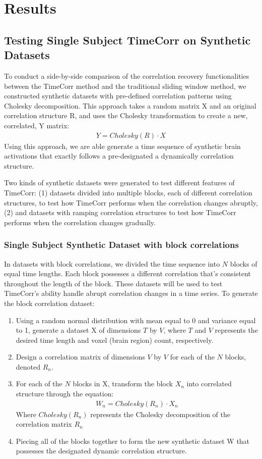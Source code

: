 \documentclass[11pt]{article}
\begin{document}
\newpage
\section{Results}
\subsection{Testing Single Subject TimeCorr on Synthetic Datasets}
To conduct a side-by-side comparison of the correlation recovery functionalities between the TimeCorr method and the traditional sliding window method, we constructed synthetic datasets with pre-defined correlation patterns using Cholesky decomposition. This approach takes a random matrix X and an original correlation structure R, and uses the Cholesky transformation to create a new, correlated, Y matrix:
\begin{align*}
Y = Cholesky(R) \cdot X
\end{align*}
Using this approach, we are able generate a time sequence of synthetic brain activations that exactly follows a pre-designated a dynamically correlation structure.

Two kinds of synthetic datasets were generated to test different features of TimeCorr: (1) datasets divided into multiple blocks, each of different correlation structures, to test how TimeCorr performs when the correlation changes abruptly, (2) and datasets with ramping correlation structures to test how TimeCorr performs when the correlation changes gradually.

\subsubsection{Single Subject Synthetic Dataset with block correlations}

In datasets with block correlations, we divided the time sequence into $N$ blocks of equal time lengths. Each block possesses a different correlation that's consistent throughout the length of the block. These datasets will be used to test TimeCorr's ability handle abrupt correlation changes in a time series. To generate the block correlation dataset:
\begin{enumerate}
\item Using a random normal distribution with mean equal to 0 and variance equal to 1, generate a dataset X of dimensions $T$ by $V$, where $T$ and $V$ represents the desired time length and voxel (brain region) count, respectively.
\item Design a correlation matrix of dimensions $V$ by $V$ for each of the $N$ blocks, denoted $R_n$.
\item For each of the $N$ blocks in X, transform the block $X_n$ into correlated structure through the equation:
\begin{align*}
W_n = Cholesky(R_n) \cdot X_n
\end{align*}
Where $Cholesky(R_n)$ represents the Cholesky decomposition of the correlation matrix $R_n$
\item Piecing all of the blocks together to form the new synthetic dataset W that possesses the designated dynamic correlation structure.
\end{enumerate}
\end{document}

